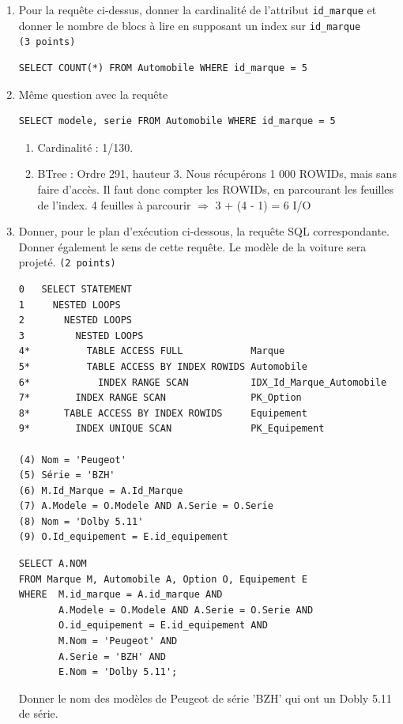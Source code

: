 \begin{enumerate}
  \item
  Pour la requête ci-dessus, donner la cardinalité de l'attribut {\tt id\_marque}
  et  donner le nombre de blocs à lire en supposant un index sur {\tt id\_marque} {\tt (3~points)}


\begin{verbatim}
SELECT COUNT(*) FROM Automobile WHERE id_marque = 5
\end{verbatim}

  \item Même question avec la requête 
  
\begin{verbatim}
SELECT modele, serie FROM Automobile WHERE id_marque = 5
\end{verbatim}

\begin{solution}
\begin{enumerate}
  \item Cardinalité : 1/130.
  \item BTree :  Ordre 291, hauteur 3. Nous récupérons 1 000 ROWIDs, mais sans faire d'accès. Il faut donc compter les ROWIDs, en parcourant les feuilles de l'index. 4 feuilles à parcourir $\Rightarrow$ 3 + (4 - 1) = 6 I/O
\end{enumerate}
\end{solution}

  \item Donner, pour le plan d'exécution ci-dessous, la requête SQL correspondante. 
   Donner également le sens de cette requête. Le modèle de la voiture sera projeté. {\tt (2~points)}
\begin{verbatim}
0   SELECT STATEMENT
1     NESTED LOOPS
2       NESTED LOOPS
3         NESTED LOOPS
4*          TABLE ACCESS FULL            Marque
5*          TABLE ACCESS BY INDEX ROWIDS Automobile
6*            INDEX RANGE SCAN           IDX_Id_Marque_Automobile        
7*        INDEX RANGE SCAN               PK_Option
8*      TABLE ACCESS BY INDEX ROWIDS     Equipement
9*        INDEX UNIQUE SCAN              PK_Equipement

(4) Nom = 'Peugeot'
(5) Série = 'BZH'
(6) M.Id_Marque = A.Id_Marque
(7) A.Modele = O.Modele AND A.Serie = O.Serie 
(8) Nom = 'Dolby 5.11'
(9) O.Id_equipement = E.id_equipement
\end{verbatim}
\begin{solution}
\begin{verbatim}
SELECT A.NOM
FROM Marque M, Automobile A, Option O, Equipement E
WHERE  M.id_marque = A.id_marque AND
       A.Modele = O.Modele AND A.Serie = O.Serie AND
       O.id_equipement = E.id_equipement AND
       M.Nom = 'Peugeot' AND
       A.Serie = 'BZH' AND
       E.Nom = 'Dolby 5.11';
\end{verbatim}
Donner le nom des modèles de Peugeot de série 'BZH' qui ont un Dobly 5.11 de série. 
\end{solution}


\end{enumerate}
